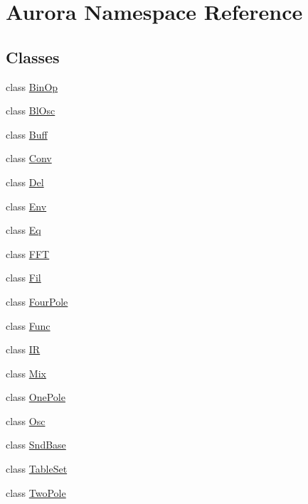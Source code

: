 \hypertarget{namespace_aurora}{}\section{Aurora Namespace Reference}
\label{namespace_aurora}
\subsection*{Classes}
\begin{DoxyCompactItemize}
\item 
class \hyperlink{class_aurora_1_1_bin_op}{Bin\+Op}
\item 
class \hyperlink{class_aurora_1_1_bl_osc}{Bl\+Osc}
\item 
class \hyperlink{class_aurora_1_1_buff}{Buff}
\item 
class \hyperlink{class_aurora_1_1_conv}{Conv}
\item 
class \hyperlink{class_aurora_1_1_del}{Del}
\item 
class \hyperlink{class_aurora_1_1_env}{Env}
\item 
class \hyperlink{class_aurora_1_1_eq}{Eq}
\item 
class \hyperlink{class_aurora_1_1_f_f_t}{F\+FT}
\item 
class \hyperlink{class_aurora_1_1_fil}{Fil}
\item 
class \hyperlink{class_aurora_1_1_four_pole}{Four\+Pole}
\item 
class \hyperlink{class_aurora_1_1_func}{Func}
\item 
class \hyperlink{class_aurora_1_1_i_r}{IR}
\item 
class \hyperlink{class_aurora_1_1_mix}{Mix}
\item 
class \hyperlink{class_aurora_1_1_one_pole}{One\+Pole}
\item 
class \hyperlink{class_aurora_1_1_osc}{Osc}
\item 
class \hyperlink{class_aurora_1_1_snd_base}{Snd\+Base}
\item 
class \hyperlink{class_aurora_1_1_table_set}{Table\+Set}
\item 
class \hyperlink{class_aurora_1_1_two_pole}{Two\+Pole}
\end{DoxyCompactItemize}
